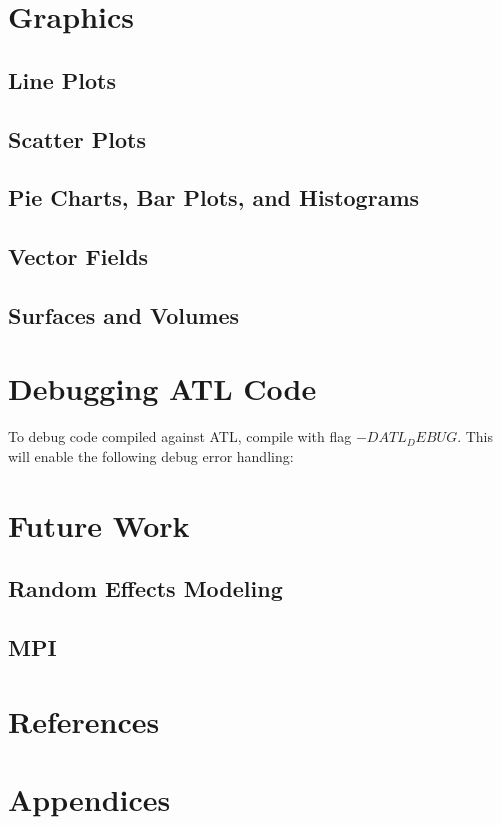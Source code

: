 \documentclass[12pt,a4paper]{article}
\begin{document}
\section{Graphics}
\subsection{Line Plots}
\subsection{Scatter Plots}
\subsection{Pie Charts, Bar Plots, and Histograms}
\subsection{Vector Fields}
\subsection{Surfaces and Volumes}
\section{Debugging ATL Code}
To debug code compiled against ATL, compile with flag $-DATL_DEBUG$. This will enable the following debug error handling:
\section{Future Work}
\subsection{Random Effects Modeling}
\subsection{MPI}
\section{References}
\section{Appendices}
\end{document}
